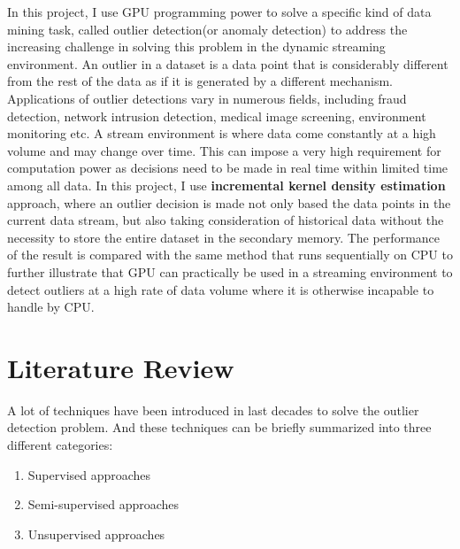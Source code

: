 \documentclass[11pt]{article}       %
\begin{document}
In this project, I use GPU programming power to solve a specific kind of data mining task, called outlier detection(or anomaly detection) to address the increasing challenge in solving this problem in the dynamic streaming environment. An outlier in a dataset is a data point that is considerably different from the rest of the data as if it is generated by a different mechanism\cite{7516110}. Applications of outlier detections vary in numerous fields, including fraud detection, network intrusion detection, medical image screening, environment monitoring etc. A stream environment is where data come constantly at a high volume and may change over time. This can impose a very high requirement for computation power as decisions need to be made in real time within limited time among all data. In this project, I use \textbf{incremental kernel density estimation} approach, where an outlier decision is made not only based the data points in the current data stream, but also taking consideration of historical data without the necessity to store the entire dataset in the secondary memory. The performance of the result is compared with the same method that runs sequentially on CPU to further illustrate that GPU can practically be used in a streaming environment to detect outliers at a high rate of data volume where it is otherwise incapable to handle by CPU. 


\section{Literature Review} \label{litrev}

A lot of techniques have been introduced in last decades to solve the outlier detection problem. And these techniques can be briefly summarized into three different categories: 

\begin{enumerate}
  \item Supervised approaches
  \item Semi-supervised approaches
  \item Unsupervised approaches
\end{enumerate}
\end{document}
